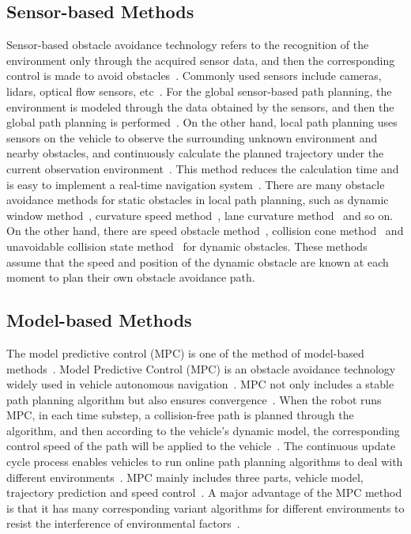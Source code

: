 \documentclass[conference]{IEEEtran}
\begin{document}
\subsection{Sensor-based Methods}
Sensor-based obstacle avoidance technology refers to the recognition of the environment only through the acquired sensor data, and then the corresponding control is made to avoid obstacles~\cite{self_driving}. Commonly used sensors include cameras, lidars, optical flow sensors, etc~\cite{self_driving}. For the global sensor-based path planning, the environment is modeled through the data obtained by the sensors, and then the global path planning is performed~\cite{self_driving}. On the other hand, local path planning uses sensors on the vehicle to observe the surrounding unknown environment and nearby obstacles, and continuously calculate the planned trajectory under the current observation environment~\cite{self_driving}. This method reduces the calculation time and is easy to implement a real-time navigation system~\cite{self_driving}. There are many obstacle avoidance methods for static obstacles in local path planning, such as dynamic window method~\cite{fox1997dynamic}, curvature speed method~\cite{simmons1996curvature}, lane curvature method~\cite{ko1998lane} and so on. On the other hand, there are speed obstacle method~\cite{fiorini1998motion}, collision cone method~\cite{chakravarthy1998obstacle} and unavoidable collision state method~\cite{fraichard2004inevitable} for dynamic obstacles. These methods assume that the speed and position of the dynamic obstacle are known at each moment to plan their own obstacle avoidance path.

\subsection{Model-based Methods}
The model predictive control (MPC) is one of the method of model-based methods~\cite{Brian2016}. Model Predictive Control (MPC) is an obstacle avoidance technology widely used in vehicle autonomous navigation~\cite{mayne2003model}. MPC not only includes a stable path planning algorithm but also ensures convergence~\cite{mayne2003model}. When the robot runs MPC, in each time substep, a collision-free path is planned through the algorithm, and then according to the vehicle's dynamic model, the corresponding control speed of the path will be applied to the vehicle~\cite{mayne2003model}. The continuous update cycle process enables vehicles to run online path planning algorithms to deal with different environments~\cite{mayne2003model}. MPC mainly includes three parts, vehicle model, trajectory prediction and speed control~\cite{mayne2003model}. A major advantage of the MPC method is that it has many corresponding variant algorithms for different environments to resist the interference of environmental factors~\cite{mayne2003model}.
\end{document}
